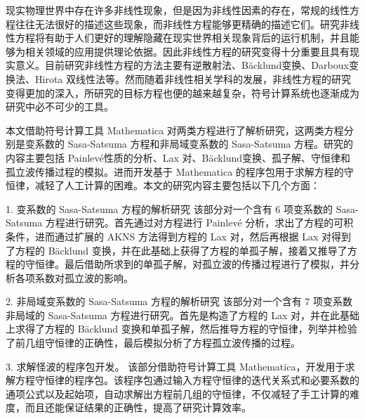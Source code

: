 


\begin{cabstract}
现实物理世界中存在许多非线性现象，但是因为非线性因素的存在，常规的线性方程往往无法很好的描述这些现象，而非线性方程能够更精确的描述它们。研究非线性方程将有助于人们更好的理解隐藏在现实世界相关现象背后的运行机制，并且能够为相关领域的应用提供理论依据。因此非线性方程的研究变得十分重要且具有现实意义。目前研究非线性方程的方法主要有逆散射法、B\"{a}cklund变换、Darboux变换法、Hirota 双线性法等。然而随着非线性相关学科的发展，非线性方程的研究变得更加的深入，所研究的目标方程也便的越来越复杂，符号计算系统也逐渐成为研究中必不可少的工具。

本文借助符号计算工具 Mathematica 对两类方程进行了解析研究，这两类方程分别是变系数的 Sasa-Satsuma 方程和非局域变系数的 Sasa-Satsuma 方程。研究的内容主要包括 Painlev\'{e}性质的分析、Lax 对、B\"{a}cklund变换、孤子解、守恒律和孤立波传播过程的模拟。进而开发基于 Mathematica 的程序包用于求解方程的守恒律，减轻了人工计算的困难。本文的研究内容主要包括以下几个方面：

1. 变系数的 Sasa-Satsuma 方程的解析研究
该部分对一个含有 6 项变系数的 Sasa-Satsuma 方程进行研究。首先通过对方程进行 Painlev\'{e} 分析，求出了方程的可积条件，进而通过扩展的 AKNS 方法得到方程的 Lax 对，然后再根据 Lax 对得到了方程的 B\"{a}cklund 变换，并在此基础上获得了方程的单孤子解，接着又推导了方程的守恒律。最后借助所求到的单孤子解，对孤立波的传播过程进行了模拟，并分析各项系数对孤立波的影响。

2. 非局域变系数的 Sasa-Satsuma 方程的解析研究
该部分对一个含有 7 项变系数非局域的 Sasa-Satsuma 方程进行研究。首先是构造了方程的 Lax 对，并在此基础上求得了方程的 B\"{a}cklund 变换和单孤子解，然后推导方程的守恒律，列举并检验了前几组守恒律的正确性，最后模拟分析了方程孤立波传播的过程。

3. 求解怪波的程序包开发。
该部分借助符号计算工具 Mathematica，开发用于求解方程守恒律的程序包。该程序包通过输入方程守恒律的迭代关系式和必要系数的通项公式以及起始项，自动求解出方程前几组的守恒律，不仅减轻了手工计算的难度，而且还能保证结果的正确性，提高了研究计算效率。

\end{cabstract}


